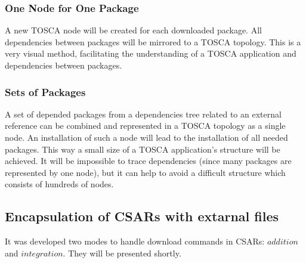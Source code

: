 \subsubsection*{One Node for One Package}
A new TOSCA node will be created for each downloaded package. 
All dependencies between packages will be mirrored to a TOSCA topology.
This is a very visual method, facilitating the understanding of a TOSCA application and dependencies between packages.
\subsubsection*{Sets of Packages} \label{mode:setsofpkg}
A set of depended packages from a dependencies tree related to an external reference can be combined and represented in a TOSCA topology as a single node.
An installation of such a node will lead to the installation of all needed packages.
This way a small size of a TOSCA application's structure will be achieved.
It will be impossible to trace dependencies (since many packages are represented by one node), but it can help to avoid a difficult structure which consists of hundreds of nodes. 

\subsection{Encapsulation of CSARs with extarnal files}
It was developed two modes to handle download commands in CSARs: $addition$ and $integration$.
They will be presented shortly.

